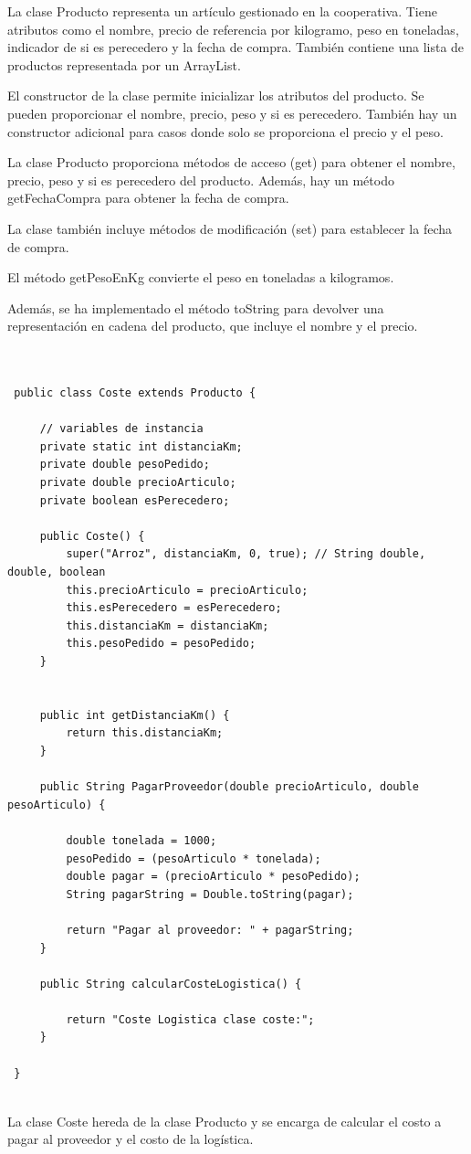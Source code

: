 \documentclass[10pt,a4paper]{article}
\def\StartLineAt#1{\lstset{firstnumber=#1}}
\begin{document}
La clase Producto representa un artículo gestionado en la cooperativa. Tiene atributos como el nombre, precio de referencia por kilogramo, peso en toneladas, indicador de si es perecedero y la fecha de compra. También contiene una lista de productos representada por un ArrayList.

El constructor de la clase permite inicializar los atributos del producto. Se pueden proporcionar el nombre, precio, peso y si es perecedero. También hay un constructor adicional para casos donde solo se proporciona el precio y el peso.

La clase Producto proporciona métodos de acceso (get) para obtener el nombre, precio, peso y si es perecedero del producto. Además, hay un método getFechaCompra para obtener la fecha de compra.

La clase también incluye métodos de modificación (set) para establecer la fecha de compra.

El método getPesoEnKg convierte el peso en toneladas a kilogramos.

Además, se ha implementado el método toString para devolver una representación en cadena del producto, que incluye el nombre y el precio.

\StartLineAt{1}
\begin{lstlisting}[style=Java]

  
 public class Coste extends Producto {
 
     // variables de instancia
     private static int distanciaKm;
     private double pesoPedido;
     private double precioArticulo;
     private boolean esPerecedero;
   
     public Coste() {
         super("Arroz", distanciaKm, 0, true); // String double, double, boolean
         this.precioArticulo = precioArticulo;
         this.esPerecedero = esPerecedero;
         this.distanciaKm = distanciaKm;
         this.pesoPedido = pesoPedido;
     }
    
 
     public int getDistanciaKm() {
         return this.distanciaKm;
     }
 
     public String PagarProveedor(double precioArticulo, double pesoArticulo) {
 
         double tonelada = 1000;
         pesoPedido = (pesoArticulo * tonelada);
         double pagar = (precioArticulo * pesoPedido);
         String pagarString = Double.toString(pagar);
 
         return "Pagar al proveedor: " + pagarString;
     }
 
     public String calcularCosteLogistica() {
 
         return "Coste Logistica clase coste:";
     }
 
 }
 
\end{lstlisting}
La clase Coste hereda de la clase Producto y se encarga de calcular el costo a pagar al proveedor y el costo de la logística.
\end{document}
